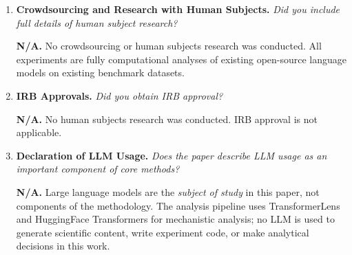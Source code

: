 \documentclass{article}
\begin{document}
{\begin{enumerate}[leftmargin=*,label=\arabic*.,itemsep=8pt]
\textbf{Yes.}
\textsc{HallScope} (anonymised, MIT License) provides
logit lens analysis, suppression ratio computation, Type~2a/2b classification,
activation patching, logit blending, and HallBench~v2 integration.
Full API documentation is available in the GitHub repository.
\textsc{HallBench~v2} (HuggingFace: \texttt{[anonymised]},
CC-BY~4.0) contains 50 curated examples with tier labels, first-token
answers, suppression metadata, and source attribution.
No personal data is included in either release.

\item \textbf{Crowdsourcing and Research with Human Subjects.}
\textit{Did you include full details of human subject research?}

\textbf{N/A.}
No crowdsourcing or human subjects research was conducted.
All experiments are fully computational analyses of existing open-source
language models on existing benchmark datasets.

\item \textbf{IRB Approvals.}
\textit{Did you obtain IRB approval?}

\textbf{N/A.}
No human subjects research was conducted. IRB approval is not applicable.

\item \textbf{Declaration of LLM Usage.}
\textit{Does the paper describe LLM usage as an important component of
core methods?}

\textbf{N/A.}
Large language models are the \emph{subject of study} in this paper,
not components of the methodology.
The analysis pipeline uses TransformerLens and HuggingFace Transformers
for mechanistic analysis; no LLM is used to generate scientific content,
write experiment code, or make analytical decisions in this work.

\end{enumerate}
}
\end{document}
